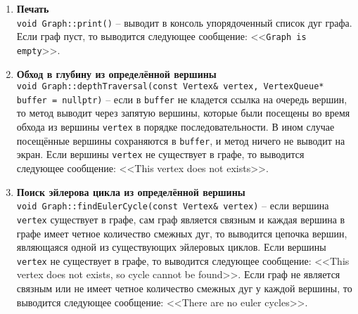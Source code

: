 \begin{enumerate}
    \item \textbf{Печать} \\
    \texttt{void Graph::print()} -- выводит в консоль упорядоченный список дуг графа. Если граф пуст, то выводится следующее сообщение: <<\texttt{Graph is empty}>>.

    \item \textbf{Обход в глубину из определённой вершины} \\
    \texttt{void Graph::depthTraversal(const Vertex\& vertex, VertexQueue* buffer = nullptr)} -- если в \texttt{buffer} не кладется ссылка на очередь вершин, то метод выводит через запятую вершины, которые были посещены во время обхода из вершины \texttt{vertex} в порядке последовательности. В ином случае посещённые вершины сохраняются в \texttt{buffer}, и метод ничего не выводит на экран. Если вершины \texttt{vertex} не существует в графе, то выводится следующее сообщение: <<This vertex does not exists>>.

    \item \textbf{Поиск эйлерова цикла из определённой вершины} \\
    \texttt{void Graph::findEulerCycle(const Vertex\& vertex)} -- если вершина \texttt{vertex} существует в графе, сам граф является связным и каждая вершина в графе имеет четное количество смежных дуг, то выводится цепочка вершин, являющаяся одной из существующих эйлеровых циклов. Если вершины \texttt{vertex} не существует в графе, то выводится следующее сообщение: <<This vertex does not exists, so cycle cannot be found>>. Если граф не является связным или не имеет четное количество смежных дуг у каждой вершины, то выводится следующее сообщение: <<There are no euler cycles>>.
\end{enumerate}

\newpage